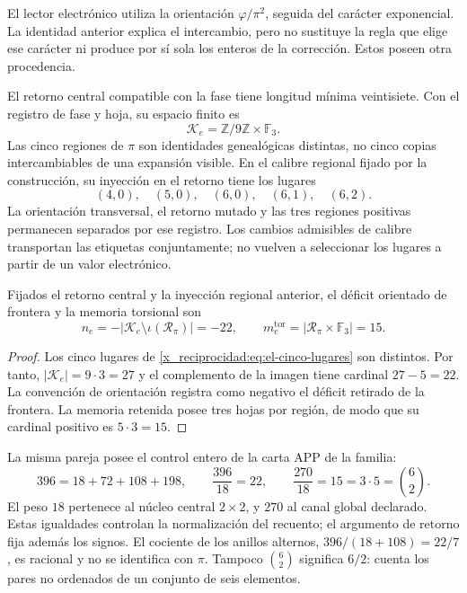 El lector electrónico utiliza la orientación \(\varphi/\pi^2\),
seguida del carácter exponencial. La identidad anterior explica el
intercambio, pero no sustituye la regla que elige ese carácter ni produce
por sí sola los enteros de la corrección. Estos poseen otra procedencia.

El retorno central compatible con la fase tiene longitud mínima
veintisiete. Con el registro de fase y hoja, su espacio finito es
\[
 \mathcal K_e=\mathbb Z/9\mathbb Z\times\mathbb F_3.
\]
Las cinco regiones de \(\pi\) son identidades genealógicas distintas,
no cinco copias intercambiables de una expansión visible. En el calibre
regional fijado por la construcción, su inyección en el retorno tiene
los lugares
\begin{equation}
 (4,0),\quad(5,0),\quad(6,0),\quad(6,1),\quad(6,2).
 \label{x_reciprocidad:eq:el-cinco-lugares}
\end{equation}
La orientación transversal, el retorno mutado y las tres regiones
positivas permanecen separados por ese registro. Los cambios admisibles
de calibre transportan las etiquetas conjuntamente; no vuelven a
seleccionar los lugares a partir de un valor electrónico.

\begin{proposition}
Fijados el retorno central y la inyección regional anterior, el déficit
orientado de frontera y la memoria torsional son
\begin{equation}
 n_e=-|\mathcal K_e\setminus\iota(\mathscr R_\pi)|=-22,
 \qquad
 m_e^{\mathrm{tor}}=|\mathscr R_\pi\times\mathbb F_3|=15.
 \label{x_reciprocidad:eq:el-selector-enteros}
\end{equation}
\end{proposition}
\begin{proof}
Los cinco lugares de \eqref{x_reciprocidad:eq:el-cinco-lugares} son distintos. Por
tanto, \(|\mathcal K_e|=9\cdot3=27\) y el complemento de la imagen
tiene cardinal \(27-5=22\). La convención de orientación registra como
negativo el déficit retirado de la frontera. La memoria retenida posee
tres hojas por región, de modo que su cardinal positivo es
\(5\cdot3=15\).
\end{proof}

La misma pareja posee el control entero de la carta APP de la familia:
\begin{equation}
 396=18+72+108+198,
 \qquad \frac{396}{18}=22,
 \qquad \frac{270}{18}=15=3\cdot5=\binom62.
 \label{x_reciprocidad:eq:el-censo}
\end{equation}
El peso \(18\) pertenece al núcleo central \(2\times2\), y \(270\)
al canal global declarado. Estas igualdades controlan la normalización
del recuento; el argumento de retorno fija además los signos. El
cociente de los anillos alternos,
\(396/(18+108)=22/7\), es racional y no se identifica con \(\pi\).
Tampoco \(\binom62\) significa \(6/2\): cuenta los pares no ordenados
de un conjunto de seis elementos.

